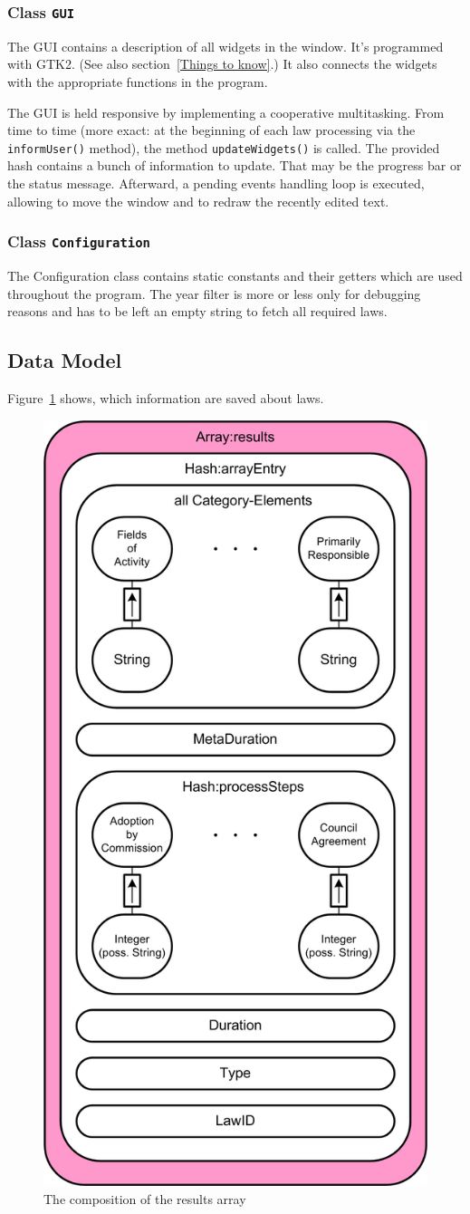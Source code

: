 \documentclass{scrartcl}
\begin{document}
\subsubsection{Class \texttt{GUI}}
The GUI contains a description of all widgets in the window. It's programmed with GTK2. (See also section~\ref{Things to know}.) It also connects the widgets with the appropriate functions in the program.

The GUI is held responsive by implementing a cooperative multitasking. From time to time (more exact: at the beginning of each law processing via the \texttt{informUser()} method), the method \texttt{updateWidgets()} is called. The provided hash contains a bunch of information to update. That may be the progress bar or the status message. Afterward, a pending events handling loop is executed, allowing to move the window and to redraw the recently edited text.



\subsubsection{Class \texttt{Configuration}}
The Configuration class contains static constants and their getters which are used throughout the program. The year filter is more or less only for debugging reasons and has to be left an empty string to fetch all required laws.



\subsection{Data Model}
Figure~\ref{DataModel} shows, which information are saved about laws.
  \begin{figure}[ht]
  \begin{center}
  \includegraphics[width = 0.5 \textwidth]{Data_Model.png}
  \caption{The composition of the results array}
  \label{DataModel}
  \end{center}
  \end{figure}
\end{document}
